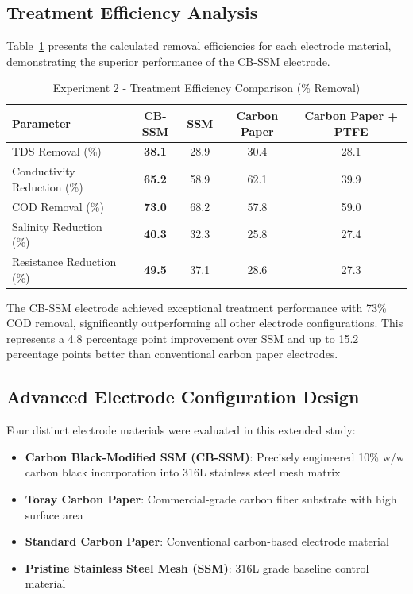 \documentclass[12pt,a4paper]{article}
\begin{document}
\subsection{Treatment Efficiency Analysis}

Table~\ref{tab:treatment_efficiency} presents the calculated removal efficiencies for each electrode material, demonstrating the superior performance of the CB-SSM electrode.

\begin{table}[htbp]
\centering
\caption{Experiment 2 - Treatment Efficiency Comparison (\% Removal)}
\label{tab:treatment_efficiency}
\begin{tabular}{@{}lcccc@{}}
\toprule
\textbf{Parameter} & \textbf{CB-SSM} & \textbf{SSM} & \textbf{Carbon Paper} & \textbf{Carbon Paper + PTFE} \\
\midrule
TDS Removal (\%) & \textbf{38.1} & 28.9 & 30.4 & 28.1 \\
Conductivity Reduction (\%) & \textbf{65.2} & 58.9 & 62.1 & 39.9 \\
COD Removal (\%) & \textbf{73.0} & 68.2 & 57.8 & 59.0 \\
Salinity Reduction (\%) & \textbf{40.3} & 32.3 & 25.8 & 27.4 \\
Resistance Reduction (\%) & \textbf{49.5} & 37.1 & 28.6 & 27.3 \\
\bottomrule
\end{tabular}
\end{table}

The CB-SSM electrode achieved exceptional treatment performance with 73\% COD removal, significantly outperforming all other electrode configurations. This represents a 4.8 percentage point improvement over SSM and up to 15.2 percentage points better than conventional carbon paper electrodes.

\subsection{Advanced Electrode Configuration Design}

Four distinct electrode materials were evaluated in this extended study:

\begin{itemize}
    \item \textbf{Carbon Black-Modified SSM (CB-SSM)}: Precisely engineered 10\% w/w carbon black incorporation into 316L stainless steel mesh matrix
    \item \textbf{Toray Carbon Paper}: Commercial-grade carbon fiber substrate with high surface area
    \item \textbf{Standard Carbon Paper}: Conventional carbon-based electrode material
    \item \textbf{Pristine Stainless Steel Mesh (SSM)}: 316L grade baseline control material
\end{itemize}
\end{document}
